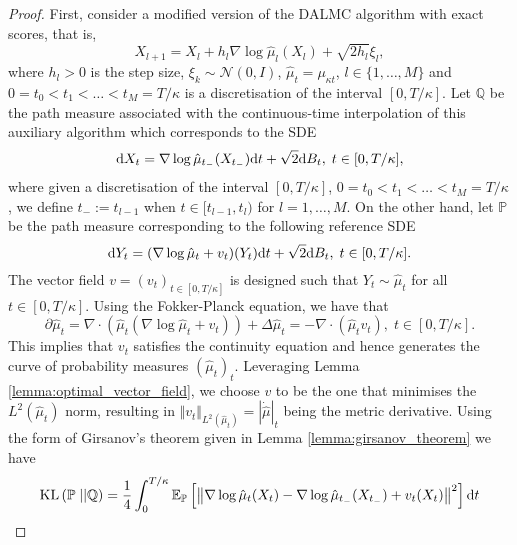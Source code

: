 \begin{proof}
First, consider a modified version of the \gls*{DALMC} algorithm with exact scores, that is,
\begin{equation}\label{eq:auxiliary_algorithm_exact_scores}
    X_{l+1} = X_l + h_l \nabla\log\hat{\mu}_l(X_l) + \sqrt{2 h_l} \xi_l,
\end{equation}
where $h_l > 0$ is the step size, $\xi_k\sim \mathcal{N}(0,I)$, $\hat{\mu}_{t} = \mu_{\kappa t}$, $l\in\{1,\dots, M\}$ and $0=t_0<t_1<\dots<t_M=T/\kappa$ is a discretisation of the interval $[0,T/\kappa]$.
Let $\mathbb{Q}$ be the path measure associated with the continuous-time interpolation of this auxiliary algorithm which corresponds to the SDE 
\begin{equation*}
    \mathrm{d} X_t = \nabla\log \hat{\mu}_{t_-}(X_{t_-})\mathrm{d} t + \sqrt{2}\mathrm{d} B_t,\; t\in[0,T/\kappa],
\end{equation*}
where given a discretisation of the interval $[0,T/\kappa]$, $0=t_0<t_1<\dots<t_M=T/\kappa$, we define $t_-:=t_{l-1}$ when $t\in[t_{l-1}, t_l)$ for $l=1,\dots, M$. On the other hand, let $\mathbb{P}$ be the path measure corresponding to the following reference SDE
\begin{equation*}
    \mathrm{d} Y_t = (\nabla\log \hat{\mu}_t + v_t)(Y_t)\mathrm{d} t + \sqrt{2}\mathrm{d} B_t,\; t\in[0,T/\kappa].
\end{equation*}
The vector field $v = (v_t)_{t\in[0,T/\kappa]}$ is designed such that $Y_t\sim\hat{\mu}_t$ for all $t\in[0, T/\kappa]$. 
Using the Fokker-Planck equation, we have that 
\begin{equation*}
    \partial\hat{\mu}_t = \nabla\cdot\left(\hat{\mu}_t(\nabla\log\hat{\mu}_t + v_t)\right)  + \Delta \hat{\mu}_t = -\nabla\cdot(\hat{\mu}_t v_t), \; t\in[0,T/\kappa].
\end{equation*}
This implies that $v_t$ satisfies the continuity equation and hence generates the curve of probability measures $(\hat{\mu}_t)_t$. Leveraging Lemma \ref{lemma:optimal_vector_field}, we choose $v$ to be the one that minimises the $L^2(\hat{\mu}_t)$ norm, resulting in $\Vert v_t\Vert_{L^2(\hat{\mu}_t)} = \left\vert\Dot{\hat{\mu}}\right\vert_t$ being the metric derivative.
Using the form of Girsanov's theorem given in Lemma \ref{lemma:girsanov_theorem} we have
\begin{align}
    \kl&\left(\mathbb{P}\;||\mathbb{Q}\right)= \frac{1}{4}\int_0^{T/\kappa}\mathbb{E}_{\mathbb{P}}\left[\left\Vert \nabla\log \hat{\mu}_t(X_t)-\nabla \log \hat{\mu}_{t_-}(X_{t_-}) + v_t(X_t)\right\Vert^2\right]\md t\nonumber\\

\end{align}
\end{proof}
